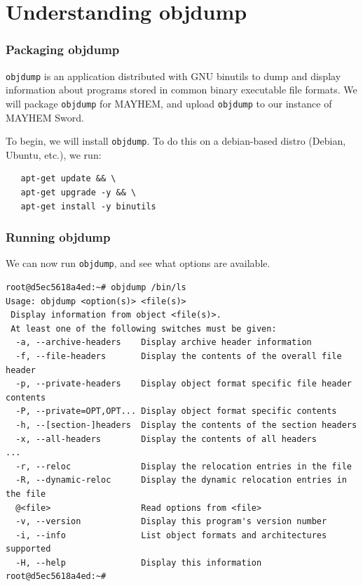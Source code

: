 \documentclass{beamer}
\begin{document}
\section{Understanding objdump}

\begin{frame}[fragile]
\frametitle{Packaging objdump}
\texttt{objdump} is an application distributed with GNU binutils to dump and display information about programs stored in common binary executable file formats. We will package \texttt{objdump} for MAYHEM, and upload \texttt{objdump} to our instance of MAYHEM Sword.

To begin, we will install \texttt{objdump}. To do this on a debian-based distro (Debian, Ubuntu, etc.), we run:

\begin{lstlisting}
   apt-get update && \
   apt-get upgrade -y && \
   apt-get install -y binutils
\end{lstlisting}
\end{frame}

\begin{frame}[fragile]
\frametitle{Running objdump}
We can now run \texttt{objdump}, and see what options are available.

\begin{lstlisting}[basicstyle=\tiny]
root@d5ec5618a4ed:~# objdump /bin/ls
Usage: objdump <option(s)> <file(s)>
 Display information from object <file(s)>.
 At least one of the following switches must be given:
  -a, --archive-headers    Display archive header information
  -f, --file-headers       Display the contents of the overall file header
  -p, --private-headers    Display object format specific file header contents
  -P, --private=OPT,OPT... Display object format specific contents
  -h, --[section-]headers  Display the contents of the section headers
  -x, --all-headers        Display the contents of all headers
...
  -r, --reloc              Display the relocation entries in the file
  -R, --dynamic-reloc      Display the dynamic relocation entries in the file
  @<file>                  Read options from <file>
  -v, --version            Display this program's version number
  -i, --info               List object formats and architectures supported
  -H, --help               Display this information
root@d5ec5618a4ed:~# 
\end{lstlisting}
\end{frame}
\end{document}
